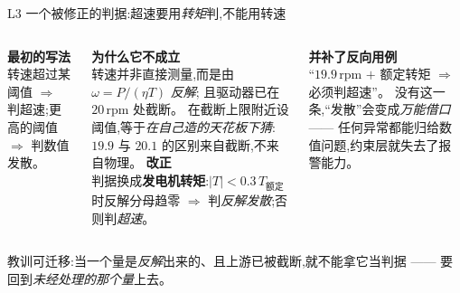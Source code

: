 \documentclass[aspectratio=169,11pt,UTF8]{ctexbeamer}
\newcommand{\emphb}[1]{\textcolor{myred}{\textbf{#1}}}
\begin{document}
\begin{frame}{L3 一个被修正的判据:超速要用\emph{转矩}判,不能用转速}
\small
\begin{columns}[T]
\textbf{最初的写法}\\[1mm]
转速超过某阈值 $\Rightarrow$ 判超速;更高的阈值 $\Rightarrow$ 判数值发散。
\vspace{1.5mm}

\textbf{为什么它不成立}\\[1mm]
转速并非直接测量,而是由 $\omega=P/(\eta T)$ \emph{反解};
且驱动器已在 $20$\,rpm 处截断。
在截断上限附近设阈值,等于\emph{在自己造的天花板下猜}:$19.9$ 与 $20.1$ 的区别来自截断,不来自物理。
\textbf{改正}\\[1mm]
判据换成\emphb{发电机转矩}:$|T|<0.3\,T_{\text{额定}}$ 时反解分母趋零 $\Rightarrow$ 判\emph{反解发散};否则判\emph{超速}。
\vspace{1.5mm}

\textbf{并补了反向用例}\\[1mm]
“$19.9$\,rpm $+$ 额定转矩 $\Rightarrow$ 必须判超速”。
没有这一条,“发散”会变成\emph{万能借口} —— 任何异常都能归给数值问题,约束层就失去了报警能力。
\end{columns}
\vspace{2mm}
\centering\footnotesize\color{mygray}
教训可迁移:当一个量是\emph{反解}出来的、且上游已被截断,就不能拿它当判据 ——
要回到\emph{未经处理的那个量}上去。
\end{frame}
\end{document}
